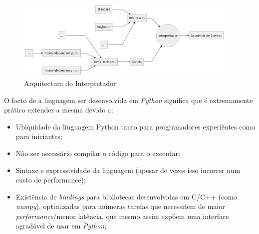 \begin{figure}[h]
\begin{center}
    \includegraphics[width=0.95\textwidth]{img/diagram_virtualmachine.png}
\end{center}
\caption{Arquitectura do Interpretador}
\end{figure}
O facto de a linguagem ser desenvolvida em \textit{Python} significa que é extremamente prático extender a mesma devido a:
\begin{itemize}
    \item Ubiquidade da linguagem Python tanto para programadores experiêntes como para iniciantes;
    \item Não ser necessário compilar o código para o executar;
    \item Sintaxe e expressividade da linguagem (apesar de vezes isso incorrer num custo de performance);
    \item Existência de \textit{bindings} para bibliotecas desenvolvidas em C/C++ (como \textit{numpy}), optimizadas para inúmeras tarefas que necessitem de maior \textit{performance}/menor latência, que mesmo assim expôem uma interface agradável de usar em \textit{Python};
\end{itemize}

